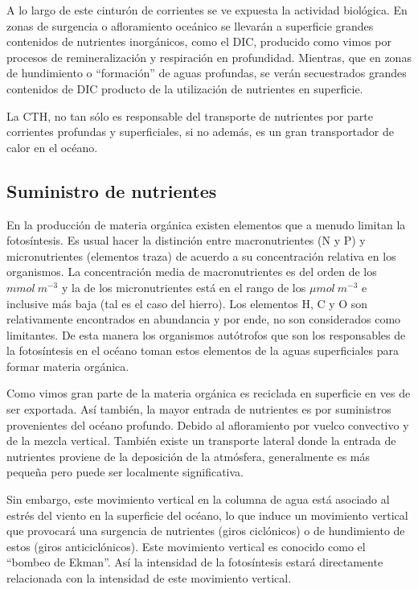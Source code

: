 A lo largo de este cinturón de corrientes se ve expuesta la actividad biológica. En zonas de surgencia o afloramiento oceánico se llevarán a superficie grandes contenidos de nutrientes inorgánicos, como el DIC, producido como vimos por procesos de remineralización y respiración en profundidad. Mientras, que en zonas de hundimiento o ``formación'' de aguas profundas, se verán secuestrados grandes contenidos de DIC producto de la utilización de nutrientes en superficie. 

 La CTH, no tan sólo es responsable del transporte de nutrientes por parte corrientes profundas y superficiales, si no además, es un gran transportador de calor en el océano. 

\subsection{Suministro de nutrientes}

En la producci\'on de materia org\'anica existen elementos que a menudo limitan la fotos\'intesis. Es usual hacer la distinci\'on entre macronutrientes (N y P) y micronutrientes 
(elementos traza) de acuerdo a su concentraci\'on relativa en los organismos. La concentraci\'on media de macronutrientes es del orden de los $mmol\ m^{-3}$ 
y la de los micronutrientes est\'a en el rango de los $\mu mol\ m^{-3} $ e inclusive m\'as baja (tal es el caso del hierro). Los elementos H, C y O son 
relativamente encontrados en abundancia y por ende, no son considerados como limitantes. 
De esta manera los organismos autótrofos que son los responsables de la fotos\'intesis en el oc\'eano toman estos elementos de la aguas superficiales
para formar materia org\'anica.  

Como vimos gran parte de la materia org\'anica es reciclada en superficie en ves de ser exportada. Así también, la mayor entrada de nutrientes es por suministros provenientes del oc\'eano profundo.
Debido al afloramiento por vuelco convectivo y de la mezcla vertical. Tambi\'en existe un transporte lateral donde la entrada de nutrientes proviene de la deposici\'on de la atm\'osfera, generalmente
es m\'as peque\~na pero puede ser localmente significativa. 

Sin embargo, este movimiento vertical en la columna de agua está asociado al estrés del viento en la superficie del océano, lo que induce un movimiento vertical que provocará una surgencia de nutrientes (giros ciclónicos) o de hundimiento de estos (giros anticiclónicos). Este movimiento vertical es conocido como el ``bombeo de Ekman''. Así la intensidad de la fotosíntesis estará directamente relacionada con la intensidad de este movimiento vertical. 

